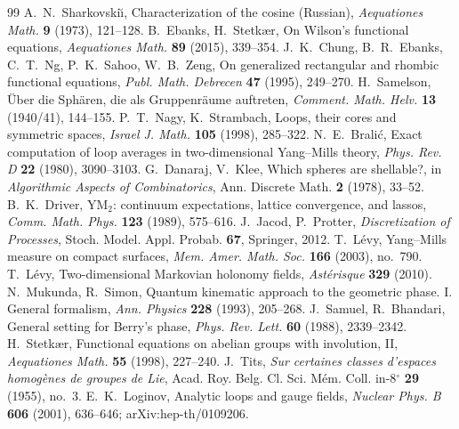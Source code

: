\documentclass[11pt,reqno]{amsart}
\theoremstyle{definition}
\theoremstyle{remark}
\numberwithin{equation}{section}
\begin{document}
\begin{thebibliography}{99}
 A.~N.~Sharkovski\u{\i}, Characterization of the cosine (Russian), \emph{Aequationes Math.} \textbf{9} (1973), 121--128.
 B.~Ebanks, H.~Stetk\ae r, On Wilson's functional equations, \emph{Aequationes Math.} \textbf{89} (2015), 339--354.
 J.~K.~Chung, B.~R.~Ebanks, C.~T.~Ng, P.~K.~Sahoo, W.~B.~Zeng, On generalized rectangular and rhombic functional equations, \emph{Publ. Math. Debrecen} \textbf{47} (1995), 249--270.
 H.~Samelson, \"Uber die Sph\"aren, die als Gruppenr\"aume auftreten, \emph{Comment. Math. Helv.} \textbf{13} (1940/41), 144--155.
 P.~T.~Nagy, K.~Strambach, Loops, their cores and symmetric spaces, \emph{Israel J. Math.} \textbf{105} (1998), 285--322.
 N.~E.~Bralić, Exact computation of loop averages in two-dimensional Yang--Mills theory, \emph{Phys. Rev. D} \textbf{22} (1980), 3090--3103.
 G.~Danaraj, V.~Klee, Which spheres are shellable?, in \emph{Algorithmic Aspects of Combinatorics}, Ann. Discrete Math. \textbf{2} (1978), 33--52.
 B.~K.~Driver, YM$_2$: continuum expectations, lattice convergence, and lassos, \emph{Comm. Math. Phys.} \textbf{123} (1989), 575--616.
 J.~Jacod, P.~Protter, \emph{Discretization of Processes}, Stoch. Model. Appl. Probab. \textbf{67}, Springer, 2012.
 T.~L\'evy, Yang--Mills measure on compact surfaces, \emph{Mem. Amer. Math. Soc.} \textbf{166} (2003), no.~790.
 T.~L\'evy, Two-dimensional Markovian holonomy fields, \emph{Ast\'erisque} \textbf{329} (2010).
 N.~Mukunda, R.~Simon, Quantum kinematic approach to the geometric phase. I. General formalism, \emph{Ann. Physics} \textbf{228} (1993), 205--268.
 J.~Samuel, R.~Bhandari, General setting for Berry's phase, \emph{Phys. Rev. Lett.} \textbf{60} (1988), 2339--2342.
 H.~Stetk\ae r, Functional equations on abelian groups with involution, II, \emph{Aequationes Math.} \textbf{55} (1998), 227--240.
 J.~Tits, \emph{Sur certaines classes d'espaces homog\`enes de groupes de Lie}, Acad. Roy. Belg. Cl. Sci. M\'em. Coll. in-8$^\circ$ \textbf{29} (1955), no.~3.
 E.~K.~Loginov, Analytic loops and gauge fields, \emph{Nuclear Phys. B} \textbf{606} (2001), 636--646; arXiv:hep-th/0109206.

\end{thebibliography}
\end{document}
